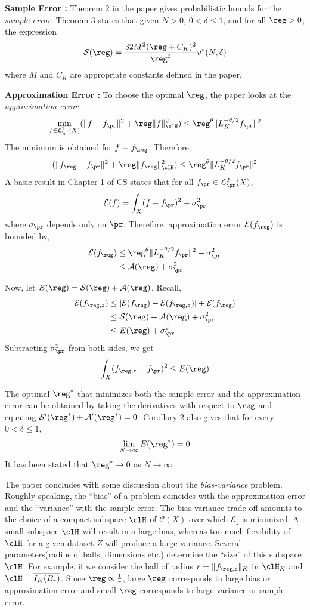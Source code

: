 \begin{itemize}
\noindent \textbf{Sample Error :}
Theorem 2 in the paper gives probabilistic bounds for the \textit{sample error}.
Theorem 3 states that given $N>0$, $0<\delta \leq 1$, and for all $\reg>0$, the expression 
\[
\mathcal{S}(\reg) = \frac{32 M^2 (\reg + C_K)^2}{\reg^2} v^*(N,\delta)
\]
where $M$ and $C_K$ are appropriate constants defined in the paper. 

\noindent \textbf{Approximation Error :} To choose the optimal $\reg$, the paper looks at the \textit{approximation error}. 
\[
\min_{f \in \mathcal{L}_\pr^2(X)} (\|f - f_\pr\|^2 + \reg \|f\|^2_\clH) \leq \reg^\theta \|L_K^{-\theta/2} f_\pr \|^2
\]
The minimum is obtained for $f = f_\reg$. Therefore,
\[
(\|f_\reg - f_\pr\|^2 + \reg \|f_\reg\|^2_\clH) \leq \reg^\theta \|L_K^{-\theta/2} f_\pr \|^2
\]
A basic result in Chapter 1 of CS states that for all $f_\pr \in \mathcal{L}_\pr^2(X)$, 
\[
\mathcal{E}(f) = \int_X (f - f_\pr)^2 + \sigma_\pr^2
\]
where $\sigma_\pr$ depends only on $\pr$. Therefore, approximation error $\mathcal{E}(f_\reg)$ is bounded by,
\[
\begin{aligned}
\mathcal{E}(f_\reg)  & \leq \reg^\theta \|L_K^{-\theta/2} f_\pr \|^2 + \sigma_\pr^2\\
& \leq \mathcal{A}(\reg) + \sigma_\pr^2 
\end{aligned}
\]

Now, let $E(\reg) = \mathcal{S}(\reg) + \mathcal{A}(\reg)$. 
Recall,
\[
\begin{aligned}
\mathcal{E}(f_{\reg,z}) &\leq |\mathcal{E}(f_\reg) - \mathcal{E}(f_{\reg,z})| + \mathcal{E}(f_\reg) \\
& \leq \mathcal{S}(\reg) + \mathcal{A}(\reg) + \sigma_\pr^2\\
& \leq E(\reg) + \sigma_\pr^2
\end{aligned}
\]
Subtracting $\sigma_\pr^2$ from both sides, we get
\[
\int_X (f_{\reg,z} - f_\pr)^2 \leq E(\reg)
\]

The optimal $\reg^*$ that minimizes both the sample error and the approximation error can be obtained by taking the derivatives with respect to $\reg$ and equating $\mathcal{S}'(\reg^*) + \mathcal{A}'(\reg^*) =0$. Corollary 2 also gives that for every $0 <\delta \leq 1$, 
\[
\lim_{N \to \infty} E(\reg^*) = 0 
\]
It has been stated that $\reg^* \to 0$ as $N \to \infty$.

The paper concludes with some discussion about the \textit{bias-variance} problem. Roughly speaking, the ``bias'' of a problem coincides with the approximation error and the ``variance'' with the sample error. The bias-variance trade-off amounts to the choice of a compact subspace $\clH$ of $\mathcal{C}(X)$ over which $\mathcal{E}_z$ is minimized. A small subspace $\clH$ will result in a large bias, whereas too much flexibility of $\clH$ for a given dataset $Z$ will produce a large variance. 
Several parameters(radius of balls, dimensions etc.) determine the ``size'' of this subspace $\clH$. For example, if we consider the ball of radius $r = \|f_{\reg,z}\|_K$ in $\clH_K$ and $\clH = \overline{I_K(B_r)}$. Since $\reg \propto \frac{1}{r}$, large $\reg$ corresponds to large bias or approximation error and small $\reg$ corresponds to large variance or sample error. 


\end{itemize}

